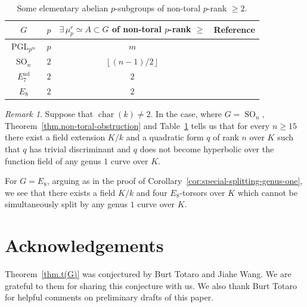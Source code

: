 \documentclass[12pt]{amsart}
\numberwithin{equation}{section}
\theoremstyle{remark}
\newtheorem{remark}[theorem]{Remark}
\newcommand{\PGL}{\operatorname{PGL}}
\newcommand{\SO}{\operatorname{SO}}
\newcommand{\Char}{\operatorname{char}}
\begin{document}
\begin{table}[ht]
\centering
\renewcommand{\arraystretch}{1.25}
\begin{tabular}{c|c|c|c}
\hline
$G$ & $p$ & $\exists\, \mu_p^r\simeq A\subset G$ of non-toral $p$-rank $\geqslant$ & Reference \\
\hline
$\PGL_{p^m}$ & $p$ &
$m$ &
\cite[Corollary~7.9]{reichstein-youssin2} \\
\hline
$\SO_n$ & $2$ &
$\left\lfloor (n-1)/2\right\rfloor$ &
\cite[Proof of Proposition~5.2]{reichstein-youssin2} \\
\hline
$E_7^{\mathrm{ad}}$ & $2$ &
$2$ &
\cite[Proposition~5.7]{reichstein-youssin2} \\
\hline
$E_8$ & $2$ &
$2$ &
\cite[Proposition~5.3]{reichstein-youssin2} \\
\hline
\end{tabular}
\caption{Some elementary abelian $p$-subgroups of non-toral $p$-rank $\geqslant 2$.}
\label{tab:RY-elementary-lower-bounds}
\end{table}

 \begin{remark} 
 Suppose that $\Char(k)\neq 2$. In the case, where $G = \SO_n$, Theorem~\ref{thm.non-toral-obstruction} and Table~\ref{tab:RY-elementary-lower-bounds} tells us that for every $n \geqslant 15$ there exist a field extension $K/k$ and a quadratic form $q$ of rank $n$ over $K$ such that $q$ has trivial discriminant and $q$ does not become hyperbolic over the function field of any genus $1$ curve over $K$. 
 
 For $G = E_8$, arguing as in the proof of Corollary~\ref{cor:special-splitting-genus-one}, we see that there exists a field $K/k$ and four $E_8$-torsors over $K$ which cannot be simultaneously split by any genus $1$ curve over $K$.
\end{remark}


\section*{Acknowledgements} Theorem~\ref{thm.t(G)} was conjectured by Burt Totaro and Jiahe Wang. We are grateful to them for sharing this conjecture with us. We also thank Burt Totaro for helpful comments on preliminary drafts of this paper. 

\end{document}
